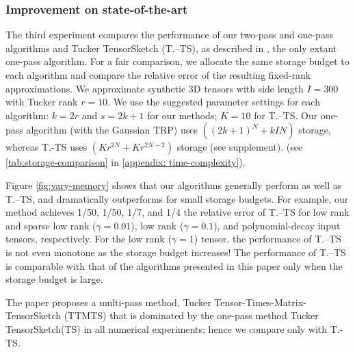 \subsubsection{Improvement on state-of-the-art}
The third experiment compares the performance of our two-pass and one-pass algorithms
and Tucker TensorSketch (T.--TS), as described in \cite{malik2018low},
the only extant one-pass algorithm.
For a fair comparison, we allocate the same storage budget to each algorithm
and compare the relative error of the resulting fixed-rank approximations.
We approximate synthetic 3D tensors with side length $I = 300$
with Tucker rank $r = 10$.
We use the suggested parameter settings for each algorithm:
$k = 2r$ and $s =2k+1$ for our methods; $K = 10$ for T.--TS.
Our one-pass algorithm
(with the Gaussian TRP)
uses $((2k+1)^N + kIN)$ storage,
whereas T.-TS uses $(Kr^{2N}+Kr^{2N-2})$ storage
\ifdefined \issupplement
(see supplement).
\else
(see \ref{tab:storage-comparison} in \ref{appendix: time-complexity}).
\fi


Figure \ref{fig:vary-memory} shows that our algorithms generally perform as well as T.--TS,
and dramatically outperforms for small storage budgets.
For example, our method achieves 1/50, 1/50, 1/7, and 1/4 the relative error of T.--TS
for low rank and sparse low rank ($\gamma = 0.01$), low rank ($\gamma = 0.1$), and polynomial-decay
input tensors, respectively.
For the low rank ($\gamma = 1$) tensor, the performance of T.--TS is not even monotone as the storage budget increases!
The performance of T.--TS is comparable with that of
the algorithms presented in this paper only when the storage budget is large.

\begin{remark}
	The paper \cite{malik2018low} proposes a multi-pass method, Tucker Tensor-Times-Matrix-TensorSketch (TTMTS) that is dominated by the one-pass method Tucker TensorSketch(TS) in all numerical experiments;
  hence we compare only with T.-TS.
\end{remark}

